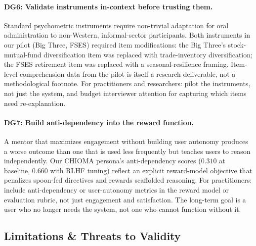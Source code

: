 \paragraph{DG6: Validate instruments in-context before trusting them.}
Standard psychometric instruments require non-trivial adaptation for oral administration to non-Western, informal-sector participants. Both instruments in our pilot (Big Three, FSES) required item modifications: the Big Three's stock-mutual-fund diversification item was replaced with trade-inventory diversification; the FSES retirement item was replaced with a seasonal-resilience framing. Item-level comprehension data from the pilot is itself a research deliverable, not a methodological footnote. For practitioners and researchers: pilot the instruments, not just the system, and budget interviewer attention for capturing which items need re-explanation.

\paragraph{DG7: Build anti-dependency into the reward function.}
A mentor that maximizes engagement without building user autonomy produces a worse outcome than one that is used less frequently but teaches users to reason independently. Our CHIOMA persona's anti-dependency scores ($0.310$ at baseline, $0.660$ with RLHF tuning) reflect an explicit reward-model objective that penalizes spoon-fed directives and rewards scaffolded reasoning. For practitioners: include anti-dependency or user-autonomy metrics in the reward model or evaluation rubric, not just engagement and satisfaction. The long-term goal is a user who no longer needs the system, not one who cannot function without it.

\subsection{Limitations \& Threats to Validity}
\label{subsec:discussion-limitations}

